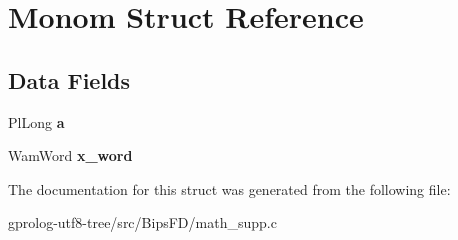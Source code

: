\hypertarget{structMonom}{}\section{Monom Struct Reference}
\label{structMonom}
\subsection*{Data Fields}
\begin{DoxyCompactItemize}
\item 
Pl\+Long {\bfseries a}\hypertarget{structMonom_a65b12a1274c4471fce35332ef4bb84f6}{}\label{structMonom_a65b12a1274c4471fce35332ef4bb84f6}

\item 
Wam\+Word {\bfseries x\+\_\+word}\hypertarget{structMonom_a72cc88b43a8727f47d9e50db2cda700f}{}\label{structMonom_a72cc88b43a8727f47d9e50db2cda700f}

\end{DoxyCompactItemize}


The documentation for this struct was generated from the following file\+:\begin{DoxyCompactItemize}
\item 
gprolog-\/utf8-\/tree/src/\+Bips\+F\+D/math\+\_\+supp.\+c\end{DoxyCompactItemize}
